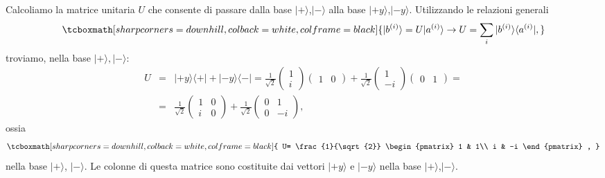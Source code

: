 Calcoliamo la matrice unitaria $U$ che consente di passare dalla base $| + \rangle $,$| - \rangle $ alla base $| +y \rangle $,$| -y \rangle$. Utilizzando le relazioni generali
		\begin{equation}
		\tcboxmath[sharp corners=downhill, colback=white, colframe=black]{
			| b^{(i)}\rangle =U| a^{(i)} \rangle \rightarrow U = \sum \limits_i | b^{(i)}\rangle \langle a^{(i)}| ,
			}
	\end{equation}
troviamo, nella base $| + \rangle,| - \rangle$:
	\begin{eqnarray}
		U &=& | +y \rangle \langle + | + |-y \rangle \langle - |=
		\frac{1}{\sqrt{2}}
		\begin{pmatrix}
		1\\
		i
		\end{pmatrix}
		\begin{pmatrix}
		1 & 0
		\end{pmatrix}+
		\frac{1}{\sqrt{2}}
		\begin{pmatrix}
		1\\
		-i
		\end{pmatrix}
		\begin{pmatrix}
		0 & 1
		\end{pmatrix}= \nonumber \\
		&=&\frac{1}{\sqrt{2}}
		\begin{pmatrix}
		1 & 0\\
		i & 0
		\end{pmatrix}+
		\frac{1}{\sqrt{2}}
		\begin{pmatrix}
		0 & 1\\
		0 & -i
		\end{pmatrix} ,
	\end{eqnarray}
ossia
	\begin{equation}
		\tcboxmath[sharp corners=downhill, colback=white, colframe=black]{
			U= \frac{1}{\sqrt{2}}
			\begin{pmatrix}
			1 & 1\\
			i & -i
			\end{pmatrix} ,
			}
	\end{equation}
nella base $| + \rangle $, $| - \rangle $. Le colonne di questa matrice sono costituite dai vettori $| +y \rangle $ e $| -y \rangle $ nella base $| + \rangle $,$| - \rangle $.\\

